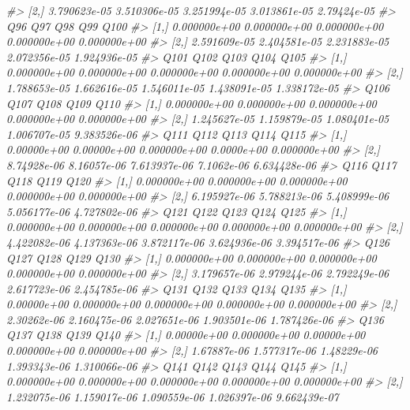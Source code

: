 \documentclass[]{article}
\newenvironment{Shaded}{\begin{snugshade}}{\end{snugshade}}
\newcommand{\CommentTok}[1]{\textcolor[rgb]{0.56,0.35,0.01}{\textit{#1}}}
\begin{document}
\begin{Shaded}
\begin{Highlighting}[]
\CommentTok{#> [2,] 3.790623e-05 3.510306e-05 3.251994e-05 3.013861e-05 2.79424e-05}
\CommentTok{#>               Q96          Q97          Q98          Q99         Q100}
\CommentTok{#> [1,] 0.000000e+00 0.000000e+00 0.000000e+00 0.000000e+00 0.000000e+00}
\CommentTok{#> [2,] 2.591609e-05 2.404581e-05 2.231883e-05 2.072356e-05 1.924936e-05}
\CommentTok{#>              Q101         Q102         Q103         Q104         Q105}
\CommentTok{#> [1,] 0.000000e+00 0.000000e+00 0.000000e+00 0.000000e+00 0.000000e+00}
\CommentTok{#> [2,] 1.788653e-05 1.662616e-05 1.546011e-05 1.438091e-05 1.338172e-05}
\CommentTok{#>              Q106         Q107         Q108         Q109         Q110}
\CommentTok{#> [1,] 0.000000e+00 0.000000e+00 0.000000e+00 0.000000e+00 0.000000e+00}
\CommentTok{#> [2,] 1.245627e-05 1.159879e-05 1.080401e-05 1.006707e-05 9.383526e-06}
\CommentTok{#>             Q111        Q112         Q113       Q114         Q115}
\CommentTok{#> [1,] 0.00000e+00 0.00000e+00 0.000000e+00 0.0000e+00 0.000000e+00}
\CommentTok{#> [2,] 8.74928e-06 8.16057e-06 7.613937e-06 7.1062e-06 6.634428e-06}
\CommentTok{#>              Q116         Q117         Q118         Q119         Q120}
\CommentTok{#> [1,] 0.000000e+00 0.000000e+00 0.000000e+00 0.000000e+00 0.000000e+00}
\CommentTok{#> [2,] 6.195927e-06 5.788213e-06 5.408999e-06 5.056177e-06 4.727802e-06}
\CommentTok{#>              Q121         Q122         Q123         Q124         Q125}
\CommentTok{#> [1,] 0.000000e+00 0.000000e+00 0.000000e+00 0.000000e+00 0.000000e+00}
\CommentTok{#> [2,] 4.422082e-06 4.137363e-06 3.872117e-06 3.624936e-06 3.394517e-06}
\CommentTok{#>              Q126         Q127         Q128         Q129         Q130}
\CommentTok{#> [1,] 0.000000e+00 0.000000e+00 0.000000e+00 0.000000e+00 0.000000e+00}
\CommentTok{#> [2,] 3.179657e-06 2.979244e-06 2.792249e-06 2.617723e-06 2.454785e-06}
\CommentTok{#>             Q131         Q132         Q133         Q134         Q135}
\CommentTok{#> [1,] 0.00000e+00 0.000000e+00 0.000000e+00 0.000000e+00 0.000000e+00}
\CommentTok{#> [2,] 2.30262e-06 2.160475e-06 2.027651e-06 1.903501e-06 1.787426e-06}
\CommentTok{#>             Q136         Q137        Q138         Q139         Q140}
\CommentTok{#> [1,] 0.00000e+00 0.000000e+00 0.00000e+00 0.000000e+00 0.000000e+00}
\CommentTok{#> [2,] 1.67887e-06 1.577317e-06 1.48229e-06 1.393343e-06 1.310066e-06}
\CommentTok{#>              Q141         Q142         Q143         Q144         Q145}
\CommentTok{#> [1,] 0.000000e+00 0.000000e+00 0.000000e+00 0.000000e+00 0.000000e+00}
\CommentTok{#> [2,] 1.232075e-06 1.159017e-06 1.090559e-06 1.026397e-06 9.662439e-07}

\end{Highlighting}
\end{Shaded}
\end{document}

